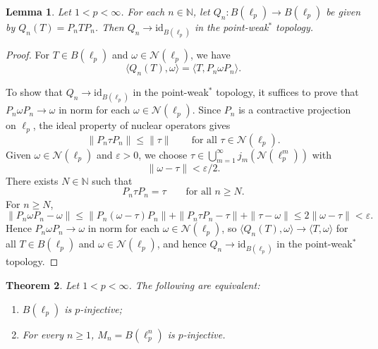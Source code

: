 \documentclass[12pt]{article}
\newtheorem{theorem}{Theorem}[section]
\newtheorem{lemma}[theorem]{Lemma}
\begin{document}
\begin{lemma}\label{lem:Qn-approx-identity}
Let $1<p<\infty$. For each $n\in\mathbb{N}$, let $Q_n:B(\ell_p)\to B(\ell_p)$ be given by $Q_n(T)=P_nTP_n$.
Then $Q_n\to\mathrm{id}_{B(\ell_p)}$ in the point-weak$^*$ topology.
\end{lemma}

\begin{proof}
For $T\in B(\ell_p)$ and $\omega\in \mathcal{N}(\ell_p)$, we have
\[
        \langle Q_n(T),\omega\rangle=\langle T,P_n\omega P_n\rangle.
\]

To show that $Q_n\to\mathrm{id}_{B(\ell_p)}$ in the point-weak$^*$ topology,
it suffices to prove that $P_n\omega P_n\to\omega$ in norm for each $\omega\in \mathcal{N}(\ell_p)$.
Since $P_n$ is a contractive projection on $\ell_p$, the ideal property of
nuclear operators gives
\[
        \|P_n\tau P_n\|\leq\|\tau\|\qquad\text{for all }\tau\in \mathcal{N}(\ell_p).
\]
Given $\omega\in \mathcal{N}(\ell_p)$ and $\varepsilon>0$, we choose
$\tau\in \bigcup_{m=1}^\infty j_m(\mathcal{N}(\ell_p^m))$ with
\[
        \|\omega-\tau\|<\varepsilon/2.
\]
There exists $N\in\mathbb{N}$ such that
\[
        P_n\tau P_n=\tau\qquad\text{for all }n\geq N.
\]
For $n\geq N$,
\[
        \|P_n\omega P_n-\omega\|
        \leq\|P_n(\omega-\tau)P_n\|+\|P_n\tau P_n-\tau\|+\|\tau-\omega\|
        \leq 2\|\omega-\tau\|<\varepsilon.
\]
Hence $P_n\omega P_n\to\omega$ in norm for each $\omega\in \mathcal{N}(\ell_p)$, so
$\langle Q_n(T),\omega\rangle\to\langle T,\omega\rangle$ for all $T\in B(\ell_p)$ and
$\omega\in \mathcal{N}(\ell_p)$, and hence $Q_n\to\mathrm{id}_{B(\ell_p)}$ in the point-weak$^*$ topology.
\end{proof}

\begin{theorem}\label{thm:B-lp-Mn-injective-equiv}
Let $1 < p < \infty$. The following are equivalent:
\begin{enumerate}
        \item[\rm(1)] $B(\ell_p)$ is $p$-injective;
        \item[\rm(2)] For every $n \geq 1$, $M_n=B(\ell_p^n)$ is $p$-injective.
\end{enumerate}
\end{theorem}
\end{document}
